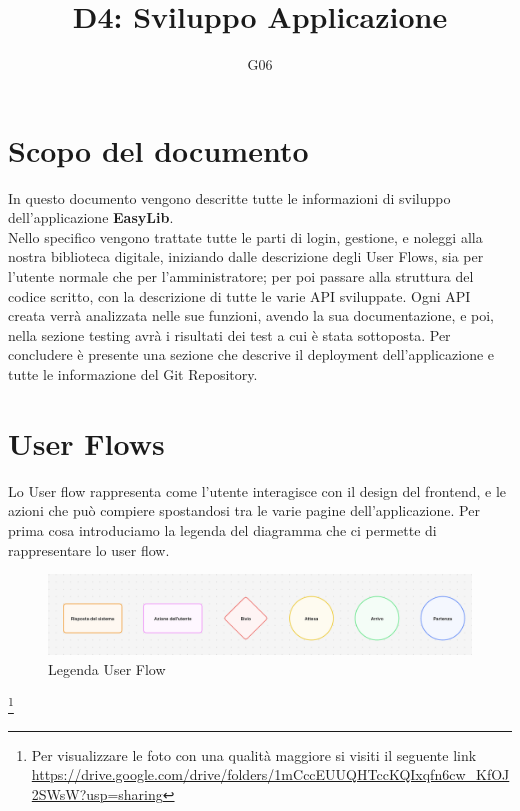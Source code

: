 \documentclass{article}
\title{D4: Sviluppo Applicazione}
\author{G06}
\begin{document}
\maketitle
\tableofcontents
\newpage



\section{Scopo del documento}

In questo documento vengono descritte tutte le informazioni di sviluppo dell'applicazione \textbf{EasyLib}.\\
Nello specifico vengono trattate tutte le parti di login, gestione, e noleggi alla nostra biblioteca digitale, iniziando dalle descrizione degli User Flows, sia per l'utente normale che per l'amministratore; per poi passare alla struttura del codice scritto, con la descrizione di tutte le varie API sviluppate. Ogni API creata verrà analizzata nelle sue funzioni, avendo la sua documentazione, e poi, nella sezione testing avrà i risultati dei test a cui è stata sottoposta.
Per concludere è presente una sezione che descrive il deployment dell'applicazione e tutte le informazione del Git Repository.

\section{User Flows}

Lo User flow rappresenta come l'utente interagisce con il design del frontend, e le azioni che può compiere spostandosi tra le varie pagine dell'applicazione.
Per prima cosa introduciamo la legenda del diagramma che ci permette di rappresentare lo user flow.
\begin{figure}[H]
     \centering
     \includegraphics[width=130mm]{D4/Images/Legenda.png}
     \caption{Legenda User Flow}
    \end{figure}
\footnote{Per visualizzare le foto con una qualità maggiore si visiti il seguente link \url{https://drive.google.com/drive/folders/1mCccEUUQHTccKQIxqfn6cw_KfOJ2SWsW?usp=sharing}}
\end{document}
